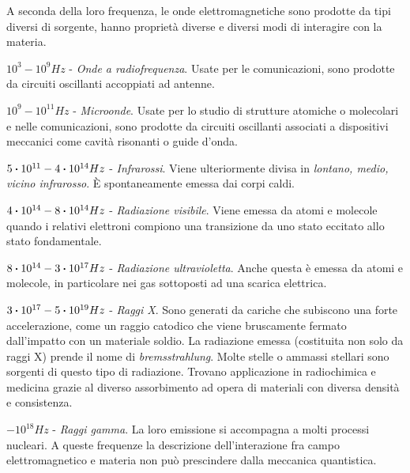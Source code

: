 A seconda della loro frequenza, le onde elettromagnetiche sono prodotte da tipi diversi di sorgente,
hanno proprietà diverse e diversi modi di interagire con la materia.

$10^3-10^9 Hz$ - \textit{Onde a radiofrequenza}.
Usate per le comunicazioni, sono prodotte da circuiti oscillanti accoppiati ad antenne.

$10^9-10^{11} Hz$ - \textit{Microonde}.
Usate per lo studio di strutture atomiche o molecolari e nelle comunicazioni, sono prodotte da circuiti oscillanti associati
a dispositivi meccanici come cavità risonanti  o guide d'onda.

$5\vdot 10^{11}-4\vdot 10^{14} Hz$ - \textit{Infrarossi}.
Viene ulteriormente divisa in \textit{lontano, medio, vicino infrarosso}. È spontaneamente emessa
dai corpi caldi.

$4\vdot 10^{14}-8\vdot 10^{14} Hz$ - \textit{Radiazione visibile}.
Viene emessa da atomi e molecole quando i relativi elettroni compiono una transizione da uno
stato eccitato allo stato fondamentale.

$8\vdot 10^{14}-3\vdot 10^{17} Hz$ - \textit{Radiazione ultravioletta}.
Anche questa è emessa da atomi e molecole, in particolare nei gas sottoposti ad una scarica elettrica.

$3\vdot 10^{17}-5\vdot 10^{19} Hz$ - \textit{Raggi X}.
Sono generati da cariche che subiscono una forte accelerazione, come un raggio catodico che viene
bruscamente fermato dall'impatto con un materiale soldio. La radiazione emessa (costituita non solo da
raggi X) prende il nome di \textit{bremsstrahlung}. Molte stelle o ammassi stellari sono sorgenti di
questo tipo di radiazione. Trovano applicazione in radiochimica e medicina grazie al diverso assorbimento
ad opera di materiali con diversa densità e consistenza.

$- 10^{18} Hz$ - \textit{Raggi gamma}.
La loro emissione si accompagna a molti processi nucleari. A queste frequenze la descrizione
dell'interazione fra campo elettromagnetico e materia non può prescindere dalla meccanica
quantistica.
